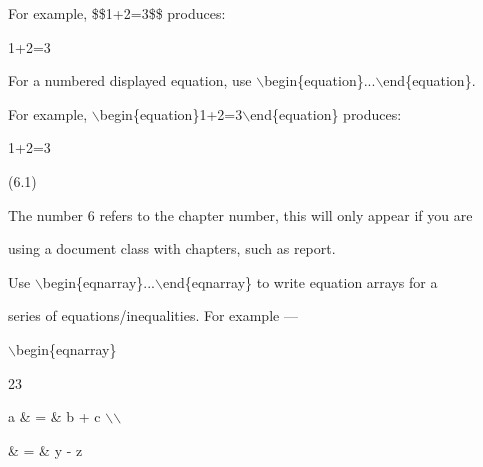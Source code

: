 \documentclass[a4paper,portrait,12pt]{article}
\begin{document}
\begin{flushleft}
For example, \$\$1+2=3\$\$ produces:
\end{flushleft}


1+2=3


\begin{flushleft}
For a numbered displayed equation, use \ensuremath{\backslash}begin\{equation\}...\ensuremath{\backslash}end\{equation\}.
\end{flushleft}


\begin{flushleft}
For example, \ensuremath{\backslash}begin\{equation\}1+2=3\ensuremath{\backslash}end\{equation\} produces:
\end{flushleft}


1+2=3





(6.1)





\begin{flushleft}
The number 6 refers to the chapter number, this will only appear if you are
\end{flushleft}


\begin{flushleft}
using a document class with chapters, such as report.
\end{flushleft}


\begin{flushleft}
Use \ensuremath{\backslash}begin\{eqnarray\}...\ensuremath{\backslash}end\{eqnarray\} to write equation arrays for a
\end{flushleft}


\begin{flushleft}
series of equations/inequalities. For example ---
\end{flushleft}


\begin{flushleft}
\ensuremath{\backslash}begin\{eqnarray\}
\end{flushleft}


23





\begin{flushleft}
\newpage
a \& = \& b + c \ensuremath{\backslash}\ensuremath{\backslash}
\end{flushleft}


\begin{flushleft}
\& = \& y - z
\end{flushleft}
\end{document}
